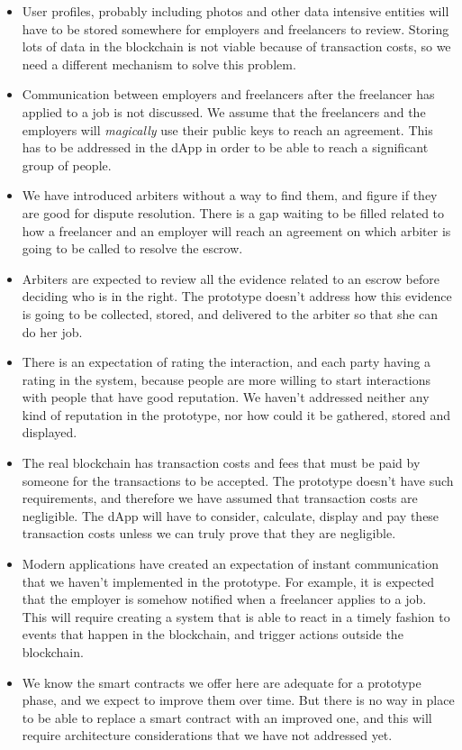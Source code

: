 \documentclass{article}
\begin{document}
\begin{itemize}
  \item User profiles, probably including photos and other data intensive entities will have to be stored somewhere for employers and freelancers to review. Storing lots of data in the blockchain is not viable because of transaction costs, so we need a different mechanism to solve this problem.
  \item Communication between employers and freelancers after the freelancer has applied to a job is not discussed. We assume that the freelancers and the employers will \emph{magically} use their public keys to reach an agreement. This has to be addressed in the dApp in order to be able to reach a significant group of people.
  \item We have introduced arbiters without a way to find them, and figure if they are good for dispute resolution. There is a gap waiting to be filled related to how a freelancer and an employer will reach an agreement on which arbiter is going to be called to resolve the escrow.
  \item Arbiters are expected to review all the evidence related to an escrow before deciding who is in the right. The prototype doesn't address how this evidence is going to be collected, stored, and delivered to the arbiter so that she can do her job.
  \item There is an expectation of rating the interaction, and each party having a rating in the system, because people are more willing to start interactions with people that have good reputation. We haven't addressed neither any kind of reputation in the prototype, nor how could it be gathered, stored and displayed.
  \item The real blockchain has transaction costs and fees that must be paid by someone for the transactions to be accepted. The prototype doesn't have such requirements, and therefore we have assumed that transaction costs are negligible. The dApp will have to consider, calculate, display and pay these transaction costs unless we can truly prove that they are negligible.
  \item Modern applications have created an expectation of instant communication that we haven't implemented in the prototype. For example, it is expected that the employer is somehow notified when a freelancer applies to a job. This will require creating a system that is able to react in a timely fashion to events that happen in the blockchain, and trigger actions outside the blockchain.
  \item We know the smart contracts we offer here are adequate for a prototype phase, and we expect to improve them over time. But there is no way in place to be able to replace a smart contract with an improved one, and this will require architecture considerations that we have not addressed yet.

\end{itemize}
\end{document}
